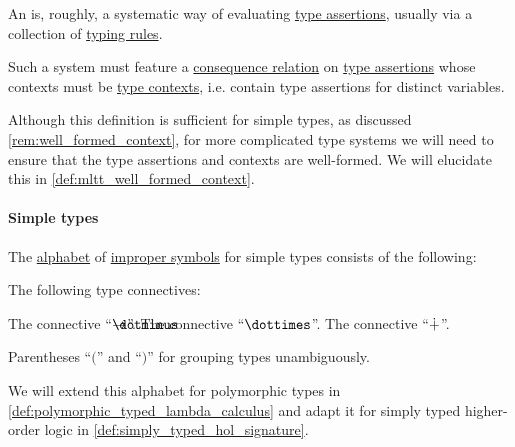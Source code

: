\begin{definition}\label{def:abstract_type_system}\mimprovised
  An  is, roughly, a systematic way of evaluating \hyperref[def:type_assertion]{type assertions}, usually via a collection of \hyperref[con:typing_rule]{typing rules}.

  Such a system must feature a \hyperref[def:consequence_relation]{consequence relation} on \hyperref[def:type_assertion]{type assertions} whose contexts must be \hyperref[def:type_context]{type contexts}, i.e. contain type assertions for distinct variables.
\end{definition}
\begin{comments}
  \item Although this definition is sufficient for simple types, as discussed \cref{rem:well_formed_context}, for more complicated type systems we will need to ensure that the type assertions and contexts are well-formed. We will elucidate this in \cref{def:mltt_well_formed_context}.
\end{comments}

\paragraph{Simple types}

\begin{definition}\label{def:simple_type_alphabet}\mimprovised
  The \hyperref[def:formal_language/alphabet]{alphabet} of \hyperref[con:improper_symbol]{improper symbols} for simple types consists of the following:

  \begin{thmenum}
     The following type connectives:
    \begin{thmenum}
       The  connective \enquote{\( \synimplies \)}.
       The  connective \enquote{\( \syntimes \)}.
       The  connective \enquote{\( \mathbin{\dotplus} \)}.
    \end{thmenum}

     Parentheses \enquote{\( ( \)} and \enquote{\( ) \)} for grouping types unambiguously.
  \end{thmenum}
\end{definition}
\begin{comments}
  \item We will extend this alphabet for polymorphic types in \cref{def:polymorphic_typed_lambda_calculus} and adapt it for simply typed higher-order logic in \cref{def:simply_typed_hol_signature}.
\end{comments}

